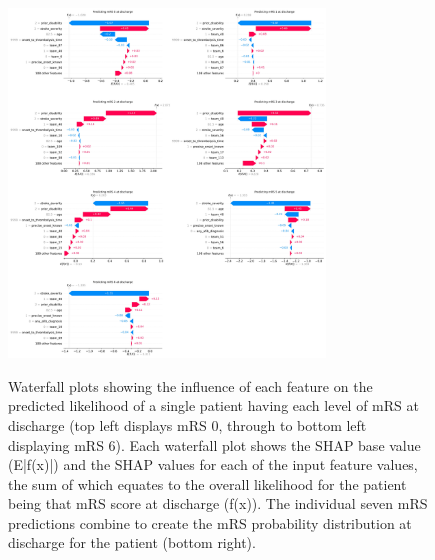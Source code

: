 \begin{figure}[!h]
    \centering    
    \includegraphics[width=0.75\textwidth]{./images/042_xgb_7_features_5fold_waterfall_for_each_class.jpg}\\
    \caption{Waterfall plots showing the influence of each feature on the predicted likelihood of a single patient having each level of mRS at discharge (top left displays mRS 0, through to bottom left displaying mRS 6). Each waterfall plot shows the SHAP base value (E|f(x)|) and the SHAP values for each of the input feature values, the sum of which equates to the overall likelihood for the patient being that mRS score at discharge (f(x)). The individual seven mRS predictions combine to create the mRS probability distribution at discharge for the patient (bottom right).
}
    \label{fig:results_waterfall_extra_words}
\end{figure}



